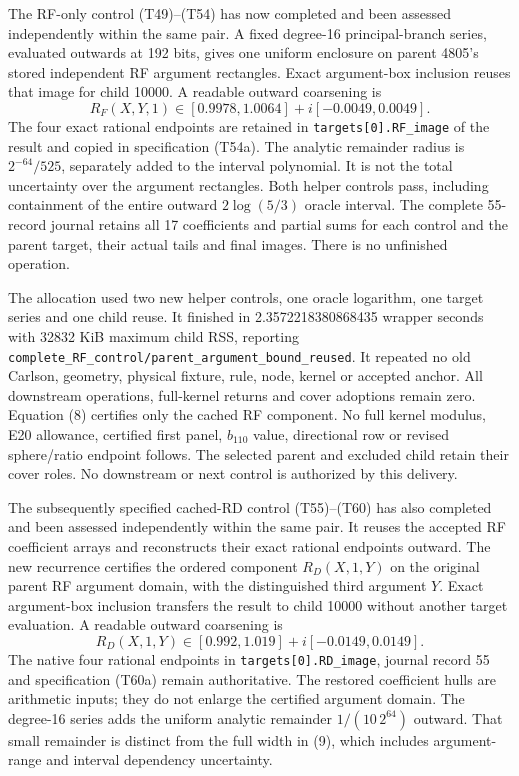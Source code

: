 \documentclass[10pt]{article}
\begin{document}
The RF-only control (T49)--(T54) has now completed and been
assessed independently within the same pair. A fixed degree-16
principal-branch series, evaluated outwards at 192 bits, gives
one uniform enclosure on parent 4805's stored independent
RF argument rectangles. Exact argument-box inclusion reuses
that image for child 10000. A readable outward coarsening is
\[
 R_F(X,Y,1)\in[0.9978,1.0064]+i[-0.0049,0.0049].              \tag{8}
\]
The four exact rational endpoints are retained in
\texttt{targets[0].RF\_image} of the result and copied in
specification (T54a). The analytic remainder radius is
$2^{-64}/525$, separately added to the interval polynomial.
It is not the total uncertainty over the argument rectangles.
Both helper controls pass, including containment of the entire
outward $2\log(5/3)$ oracle interval. The complete 55-record
journal retains all 17 coefficients and partial sums for each
control and the parent target, their actual tails and final images.
There is no unfinished operation.

The allocation used two new helper controls, one oracle
logarithm, one target series and one child reuse. It finished
in 2.3572218380868435 wrapper seconds with 32832 KiB maximum
child RSS, reporting
\texttt{complete\_RF\_control/parent\_argument\_bound\_reused}.
It repeated no old Carlson, geometry, physical fixture, rule,
node, kernel or accepted anchor. All downstream operations,
full-kernel returns and cover adoptions remain zero.
Equation (8) certifies only the cached RF component. No full
kernel modulus, E20 allowance, certified first panel, $b_{110}$
value, directional row or revised sphere/ratio endpoint follows.
The selected parent and excluded child retain their cover roles.
No downstream or next control is authorized by this delivery.

The subsequently specified cached-RD control (T55)--(T60)
has also completed and been assessed independently within
the same pair. It reuses the accepted RF coefficient arrays
and reconstructs their exact rational endpoints outward.
The new recurrence certifies the ordered component
$R_D(X,1,Y)$ on the original parent RF argument domain,
with the distinguished third argument $Y$.
Exact argument-box inclusion transfers the result to child
10000 without another target evaluation. A readable
outward coarsening is
\[
 R_D(X,1,Y)\in[0.992,1.019]+i[-0.0149,0.0149].               \tag{9}
\]
The native four rational endpoints in
\texttt{targets[0].RD\_image}, journal record 55 and
specification (T60a) remain authoritative. The restored
coefficient hulls are arithmetic inputs; they do not enlarge
the certified argument domain. The degree-16 series adds
the uniform analytic remainder $1/(10\,2^{64})$ outward.
That small remainder is distinct from the full width
in (9), which includes argument-range and interval
dependency uncertainty.
\end{document}

